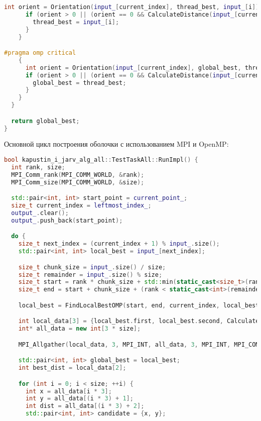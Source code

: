 \documentclass[a4paper,12pt]{article}
\begin{document}
\begin{itemize}
\begin{lstlisting}[language=C++, caption={Параллельный локальный поиск лучшей точки с OpenMP}]
      int orient = Orientation(input_[current_index], thread_best, input_[i]);
      if (orient > 0 || (orient == 0 && CalculateDistance(input_[current_index], input_[i]) > CalculateDistance(input_[current_index], thread_best))) {
        thread_best = input_[i];
      }
    }

#pragma omp critical
    {
      int orient = Orientation(input_[current_index], global_best, thread_best);
      if (orient > 0 || (orient == 0 && CalculateDistance(input_[current_index], thread_best) > CalculateDistance(input_[current_index], global_best))) {
        global_best = thread_best;
      }
    }
  }

  return global_best;
}
\end{lstlisting}
\newpage
Основной цикл построения оболочки с использованием MPI и OpenMP:

\begin{lstlisting}[language=C++, caption={Основной цикл алгоритма с MPI и OpenMP}]
bool kapustin_i_jarv_alg_all::TestTaskAll::RunImpl() {
  int rank, size;
  MPI_Comm_rank(MPI_COMM_WORLD, &rank);
  MPI_Comm_size(MPI_COMM_WORLD, &size);

  std::pair<int, int> start_point = current_point_;
  size_t current_index = leftmost_index_;
  output_.clear();
  output_.push_back(start_point);

  do {
    size_t next_index = (current_index + 1) % input_.size();
    std::pair<int, int> local_best = input_[next_index];

    size_t chunk_size = input_.size() / size;
    size_t remainder = input_.size() % size;
    size_t start = rank * chunk_size + std::min(static_cast<size_t>(rank), remainder);
    size_t end = start + chunk_size + (rank < static_cast<int>(remainder) ? 1 : 0);

    local_best = FindLocalBestOMP(start, end, current_index, local_best);

    int local_data[3] = {local_best.first, local_best.second, CalculateDistance(current_point_, local_best)};
    int* all_data = new int[3 * size];

    MPI_Allgather(local_data, 3, MPI_INT, all_data, 3, MPI_INT, MPI_COMM_WORLD);

    std::pair<int, int> global_best = local_best;
    int best_dist = local_data[2];

    for (int i = 0; i < size; ++i) {
      int x = all_data[i * 3];
      int y = all_data[(i * 3) + 1];
      int dist = all_data[(i * 3) + 2];
      std::pair<int, int> candidate = {x, y};


\end{lstlisting}
\end{itemize}
\end{document}
